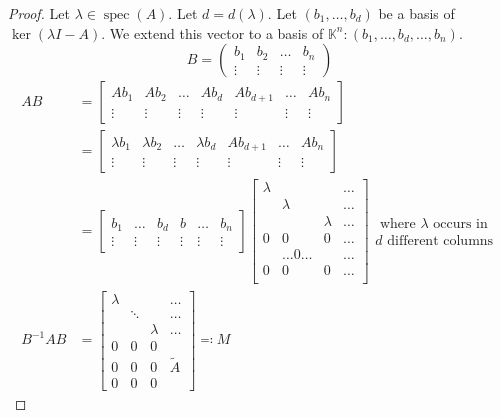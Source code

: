 \documentclass[a4paper]{article}
\numberwithin{lecref}{section}
\begin{document}
\begin{proof}
  Let $\lambda \in \operatorname{spec}(A)$. Let $d = d(\lambda)$. Let $(b_1, \dots, b_d)$ be a basis of $\ker(\lambda I - A)$.
  We extend this vector to a basis of $\mathbb K^n:  (b_1, \dots, b_d, \dots, b_n)$.
  \[ B = \begin{pmatrix} b_1 & b_2 & \dots & b_n \\ \vdots & \vdots & \vdots & \vdots \end{pmatrix} \]
  \begin{align*}
    AB &= \begin{bmatrix} Ab_1 & Ab_2 & \dots & Ab_d & Ab_{d+1} & \dots & Ab_n \\ \vdots & \vdots & \vdots & \vdots & \vdots & \vdots & \vdots \end{bmatrix} \\
       &= \begin{bmatrix} \lambda b_1 & \lambda b_2 & \dots & \lambda b_d & Ab_{d+1} & \dots & Ab_n \\ \vdots & \vdots & \vdots & \vdots & \vdots & \vdots & \vdots \end{bmatrix} \\
	       &= \begin{bmatrix} b_1 & \dots & b_d & b & \dots & b_n \\ \vdots & \vdots & \vdots & \vdots & \vdots & \vdots \end{bmatrix} \begin{bmatrix} \lambda & & & \dots \\ & \lambda & & \dots \\ & & \lambda & \dots \\ 0 & 0 & 0 & \dots \\   & \dots 0 \dots &   & \dots \\ 0 & 0 & 0 & \dots \\ \end{bmatrix} \substack{\text{ where $\lambda$ occurs in} \\ \text{$d$ different columns}} \\
    B^{-1}AB &= \begin{bmatrix} \lambda & & & \dots \\ & \ddots & & \dots \\ & & \lambda & \dots \\ 0 & 0 & 0 & \\ 0 & 0 & 0 & \tilde A \\ 0 & 0 & 0 & \end{bmatrix} \eqqcolon M
  \end{align*}


\end{proof}
\end{document}
